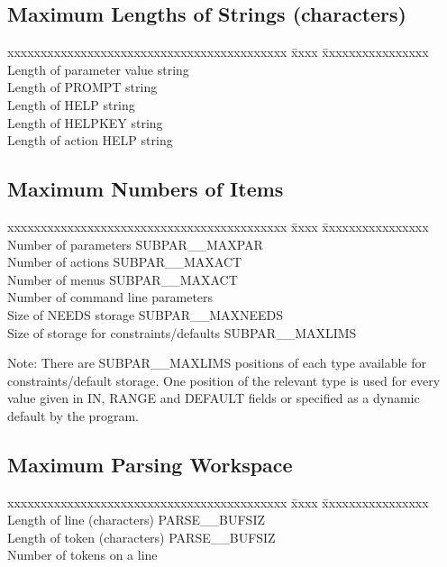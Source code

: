 \subsection*{Maximum Lengths of Strings (characters)}
\begin{center}
\begin{tabbing}
xxxxxxxxxxxxxxxxxxxxxxxxxxxxxxxxxxxxxxxxxx \= xxxx \= xxxxxxxxxxxxxxxx \kill
Length of parameter value string  \\
Length of PROMPT string    \\
Length of HELP string    \\
Length of HELPKEY string  \\
Length of action HELP string  \\
\end{tabbing} \end{center}

\subsection*{Maximum Numbers of Items}
\begin{center}
\begin{tabbing}
xxxxxxxxxxxxxxxxxxxxxxxxxxxxxxxxxxxxxxxxxx \= xxxx \= xxxxxxxxxxxxxxxx \kill
Number of parameters  \> SUBPAR\_\_MAXPAR \\
Number of actions  \> SUBPAR\_\_MAXACT \\
Number of menus  \> SUBPAR\_\_MAXACT \\
Number of command line parameters  \\
Size of NEEDS storage  \> SUBPAR\_\_MAXNEEDS \\
Size of storage for constraints/defaults  \> SUBPAR\_\_MAXLIMS \\
\end{tabbing} \end{center}

Note: There are SUBPAR\_\_MAXLIMS positions of each type available for
constraints/default storage. One position of the relevant type is used 
for every value given in IN, RANGE and DEFAULT fields or specified as a dynamic
default by the program.

\subsection*{Maximum Parsing Workspace}
\begin{center}
\begin{tabbing}
xxxxxxxxxxxxxxxxxxxxxxxxxxxxxxxxxxxxxxxxxx \= xxxx \= xxxxxxxxxxxxxxxx \kill
Length of line (characters)  \> PARSE\_\_BUFSIZ \\
Length of token (characters)  \> PARSE\_\_BUFSIZ \\
Number of tokens on a line \\
\end{tabbing} \end{center}

